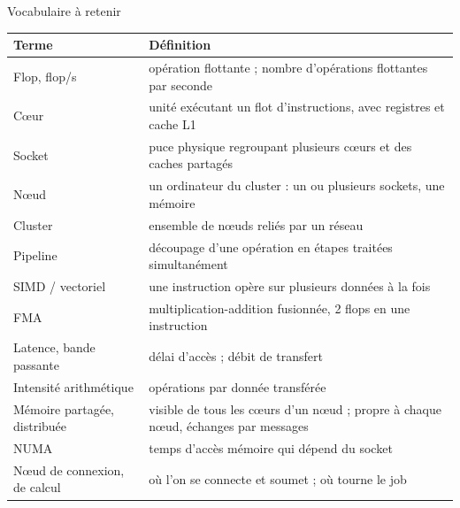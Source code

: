\documentclass[8pt,aspectratio=169]{beamer}
\begin{document}
\begin{frame}{Vocabulaire à retenir}
\centering
\small
\begin{tabular}{@{}p{3.2cm}p{9.5cm}@{}}
\toprule
\textbf{Terme} & \textbf{Définition}\\
\midrule
Flop, flop/s & opération flottante ; nombre d'opérations flottantes par seconde\\
Cœur & unité exécutant un flot d'instructions, avec registres et cache L1\\
Socket & puce physique regroupant plusieurs cœurs et des caches partagés\\
Nœud & un ordinateur du cluster : un ou plusieurs sockets, une mémoire\\
Cluster & ensemble de nœuds reliés par un réseau\\
Pipeline & découpage d'une opération en étapes traitées simultanément\\
SIMD / vectoriel & une instruction opère sur plusieurs données à la fois\\
FMA & multiplication-addition fusionnée, 2 flops en une instruction\\
Latence, bande passante & délai d'accès ; débit de transfert\\
Intensité arithmétique & opérations par donnée transférée\\
Mémoire partagée, distribuée & visible de tous les cœurs d'un nœud ; propre à chaque nœud, échanges par messages\\
NUMA & temps d'accès mémoire qui dépend du socket\\
Nœud de connexion, de calcul & où l'on se connecte et soumet ; où tourne le job\\
\bottomrule
\end{tabular}
\end{frame}
\end{document}
